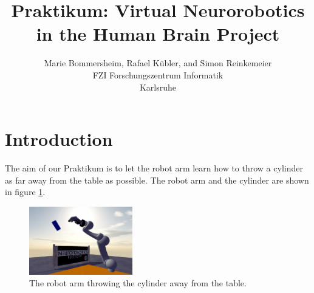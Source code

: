 \documentclass[10pt,twocolumn,letterpaper]{article}
\begin{document}
\title{Praktikum: Virtual Neurorobotics in the Human Brain Project}

\author{Marie Bommersheim, Rafael K\"ubler, and Simon Reinkemeier\\
FZI Forschungszentrum Informatik\\
Karlsruhe\\
}

\maketitle

\begin{abstract}
   
\end{abstract}

\section{Introduction}

The aim of our Praktikum is to let the robot arm learn how to throw a cylinder as far away from the table as possible. The robot arm and the cylinder are shown in figure \ref{fig:challenge}.

\begin{figure}
	\begin{center}
		\includegraphics[width=0.4\textwidth]{hbpprak_2018}
	\end{center}
	\caption{The robot arm throwing the cylinder away from the table.}
	\label{fig:challenge}
\end{figure}
\end{document}
